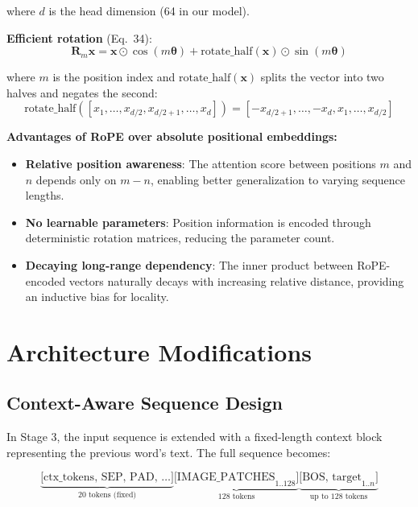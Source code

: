 \documentclass[11pt, a4paper]{article}
\begin{document}
where $d$ is the head dimension (64 in our model).

\textbf{Efficient rotation} (Eq.\ 34):
\begin{equation}
\mathbf{R}_m \mathbf{x} = \mathbf{x} \odot \cos(m\boldsymbol{\theta}) + \text{rotate\_half}(\mathbf{x}) \odot \sin(m\boldsymbol{\theta})
\label{eq:rope}
\end{equation}

where $m$ is the position index and $\text{rotate\_half}(\mathbf{x})$ splits the vector into two halves and negates the second:
\[
\text{rotate\_half}([x_1, \ldots, x_{d/2}, x_{d/2+1}, \ldots, x_d]) = [-x_{d/2+1}, \ldots, -x_d, x_1, \ldots, x_{d/2}]
\]

\textbf{Advantages of RoPE over absolute positional embeddings:}
\begin{itemize}
    \item \textbf{Relative position awareness}: The attention score between positions $m$ and $n$ depends only on $m - n$, enabling better generalization to varying sequence lengths.
    \item \textbf{No learnable parameters}: Position information is encoded through deterministic rotation matrices, reducing the parameter count.
    \item \textbf{Decaying long-range dependency}: The inner product between RoPE-encoded vectors naturally decays with increasing relative distance, providing an inductive bias for locality.
\end{itemize}

\section{Architecture Modifications}

\subsection{Context-Aware Sequence Design}

In Stage 3, the input sequence is extended with a fixed-length context block representing the previous word's text. The full sequence becomes:

\[
\underbrace{\text{[ctx\_tokens, SEP, PAD, \ldots]}}_{\text{20 tokens (fixed)}}
\underbrace{\text{[IMAGE\_PATCHES}_{1..128}\text{]}}_{\text{128 tokens}}
\underbrace{\text{[BOS, target}_{1..n}\text{]}}_{\text{up to 128 tokens}}
\]
\end{document}
